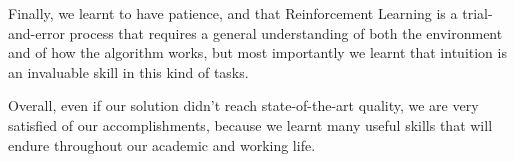 \documentclass[13pt]{article}
\begin{document}
Finally, we learnt to have patience, and that Reinforcement Learning is a trial-and-error process that requires a general understanding of both the environment and of how the algorithm works, but most importantly we learnt that intuition is an invaluable skill in this kind of tasks.

Overall, even if our solution didn't reach state-of-the-art quality, we are very satisfied of our accomplishments, because we learnt many useful skills that will endure throughout our academic and working life.

\newpage

%
%



\end{document}
